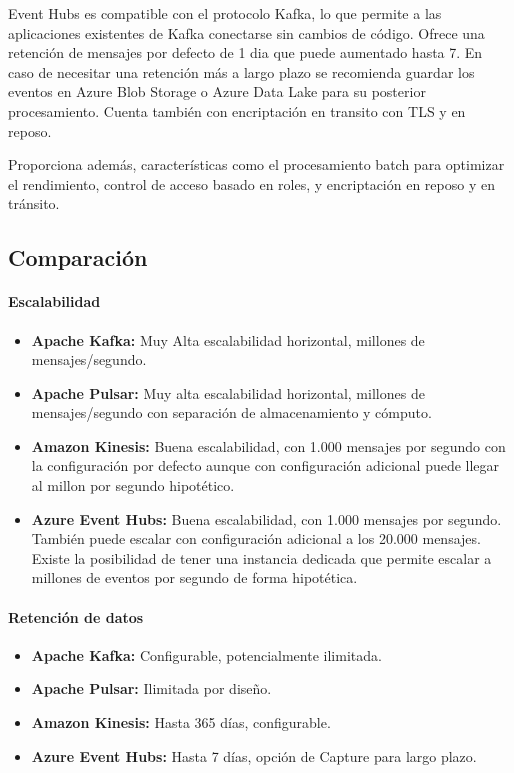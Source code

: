 Event Hubs es compatible con el protocolo Kafka, lo que permite a las aplicaciones existentes de Kafka conectarse sin cambios de código.
Ofrece una retención de mensajes por defecto de 1 dia que puede aumentado hasta 7. En caso de necesitar una retención más a largo plazo
se recomienda guardar los eventos en Azure Blob Storage o Azure Data Lake para su posterior procesamiento. 
Cuenta también con encriptación en transito con TLS y en reposo.

Proporciona además, características como el procesamiento batch para optimizar el rendimiento, 
control de acceso basado en roles, y encriptación en reposo y en tránsito. 

\subsection{Comparación}

\paragraph{Escalabilidad}
\begin{itemize}
    \item \textbf{Apache Kafka:} Muy Alta escalabilidad horizontal, millones de mensajes/segundo.
    \item \textbf{Apache Pulsar:} Muy alta escalabilidad horizontal, millones de mensajes/segundo con separación de almacenamiento y cómputo.
    \item \textbf{Amazon Kinesis:} Buena escalabilidad, con 1.000 mensajes por segundo con la configuración por defecto aunque con configuración adicional puede llegar al millon por segundo hipotético.
    \item \textbf{Azure Event Hubs:} Buena escalabilidad, con 1.000 mensajes por segundo. También puede escalar con configuración adicional a los 20.000 mensajes. Existe la posibilidad de tener una instancia dedicada que permite escalar a millones de eventos por segundo de forma hipotética.
\end{itemize}

\newpage
\paragraph{Retención de datos}
\begin{itemize}
    \item \textbf{Apache Kafka:} Configurable, potencialmente ilimitada.
    \item \textbf{Apache Pulsar:} Ilimitada por diseño.
    \item \textbf{Amazon Kinesis:} Hasta 365 días, configurable.
    \item \textbf{Azure Event Hubs:} Hasta 7 días, opción de Capture para largo plazo.
\end{itemize}


